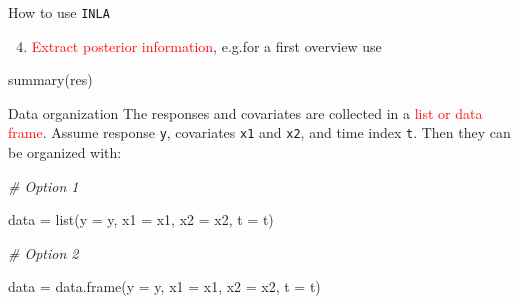 \documentclass[
  ignorenonframetext,
]{beamer}
\newenvironment{Shaded}{\begin{snugshade}}{\end{snugshade}}
\newcommand{\AttributeTok}[1]{\textcolor[rgb]{0.77,0.63,0.00}{#1}}
\newcommand{\CommentTok}[1]{\textcolor[rgb]{0.56,0.35,0.01}{\textit{#1}}}
\newcommand{\FunctionTok}[1]{\textcolor[rgb]{0.00,0.00,0.00}{#1}}
\newcommand{\NormalTok}[1]{#1}
\newcommand{\OtherTok}[1]{\textcolor[rgb]{0.56,0.35,0.01}{#1}}
\providecommand{\tightlist}{%
  \setlength{\itemsep}{0pt}\setlength{\parskip}{0pt}}
\begin{document}
\begin{frame}[fragile]{How to use \texttt{INLA}}
\begin{enumerate}
\setcounter{enumi}{3}
\tightlist
\item
  \textcolor{red}{Extract posterior information}, e.g.for a first
  overview use
\end{enumerate}

\begin{Shaded}
\begin{Highlighting}[]
\FunctionTok{summary}\NormalTok{(res)}
\end{Highlighting}
\end{Shaded}
\end{frame}

\begin{frame}[fragile]{Data organization}
\protect\hypertarget{data-organization}{}
The responses and covariates are collected in a
\textcolor{red}{list or data frame}. Assume response \texttt{y},
covariates \texttt{x1} and \texttt{x2}, and time index \texttt{t}. Then
they can be organized with:

\begin{Shaded}
\begin{Highlighting}[]
\CommentTok{\# Option 1}

\NormalTok{data }\OtherTok{=} \FunctionTok{list}\NormalTok{(}\AttributeTok{y =}\NormalTok{ y, }\AttributeTok{x1 =}\NormalTok{ x1, }\AttributeTok{x2 =}\NormalTok{ x2, }\AttributeTok{t =}\NormalTok{ t)}

\CommentTok{\# Option 2}

\NormalTok{data }\OtherTok{=} \FunctionTok{data.frame}\NormalTok{(}\AttributeTok{y =}\NormalTok{ y, }\AttributeTok{x1 =}\NormalTok{ x1, }\AttributeTok{x2 =}\NormalTok{ x2, }\AttributeTok{t =}\NormalTok{ t)}
\end{Highlighting}
\end{Shaded}
\end{frame}
\end{document}
